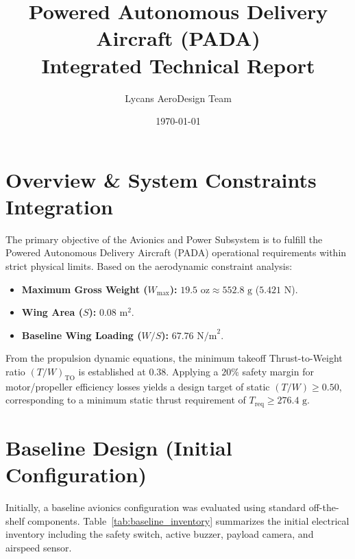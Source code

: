 \documentclass[12pt,a4paper]{article}
\begin{document}
\title{\textbf{Powered Autonomous Delivery Aircraft (PADA)\\[0.5em] Integrated Technical Report}}
\author{Lycans AeroDesign Team}
\date{\today}
\maketitle
\tableofcontents
\newpage


\section{Overview \& System Constraints Integration}
The primary objective of the Avionics and Power Subsystem is to fulfill the Powered Autonomous Delivery Aircraft (PADA) operational requirements within strict physical limits. Based on the aerodynamic constraint analysis:
\begin{itemize}
    \item \textbf{Maximum Gross Weight ($W_{\text{max}}$):} $19.5\text{ oz} \approx 552.8\text{ g}$ ($5.421\text{ N}$).
    \item \textbf{Wing Area ($S$):} $0.08\text{ m}^2$.
    \item \textbf{Baseline Wing Loading ($W/S$):} $67.76\text{ N/m}^2$.
\end{itemize}

From the propulsion dynamic equations, the minimum takeoff Thrust-to-Weight ratio $(T/W)_{\text{TO}}$ is established at $0.38$. Applying a $20\%$ safety margin for motor/propeller efficiency losses yields a design target of static $(T/W) \ge 0.50$, corresponding to a minimum static thrust requirement of $T_{\text{req}} \ge 276.4\text{ g}$.

\section{Baseline Design (Initial Configuration)}
Initially, a baseline avionics configuration was evaluated using standard off-the-shelf components. Table~\ref{tab:baseline_inventory} summarizes the initial electrical inventory including the safety switch, active buzzer, payload camera, and airspeed sensor.
\end{document}
